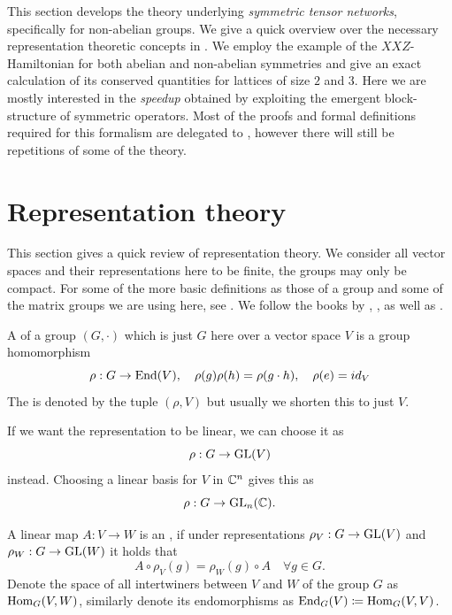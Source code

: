 This section develops the theory underlying \emph{symmetric tensor networks},
specifically for non-abelian groups. We give a quick overview over the necessary
representation theoretic concepts in . We employ the example
of the $XXZ$-Hamiltonian for both abelian and non-abelian symmetries and give an
exact calculation of its conserved quantities for lattices of size $2$ and $3$.
Here we are mostly interested in the \emph{speedup} obtained by exploiting the
emergent block-structure of symmetric operators. Most of the proofs and formal
definitions required for this formalism are delegated to ,
however there will still be repetitions of some of the theory.

\section{Representation theory}\label{sym:sub:rep}

This section gives a quick review of representation theory. We consider all
vector spaces and their representations here to be finite, the groups may only
be compact. For some of the more basic definitions as those of a group and some
of the matrix groups we are using here, see . We follow the
books by \textcite{ibortIntroductionGroupsGroupoids2019},
\textcite{serreLinearRepresentationsFinite1977},
\textcite{woitQuantumTheoryGroups2017}  as well as
\textcite{etingofIntroductionRepresentationTheory2011}.

\begin{definition}
  A  of a group $(G,\cdot)$ which is just $G$ here
  over a vector space $V$ is a group homomorphism
  \[
    \rho : G \to \operatorname{End} (V), \quad \rho(g)\rho(h) = \rho(g \cdot h), \quad \rho(e) = id_V
  \]
  The  is denoted by the tuple $(\rho, V)$
  but usually we shorten this to just $V$.

  If we want the representation to be linear, we can choose it as
  \[
    \rho : G \to \mathrm{GL}(V)
  \]
  instead. Choosing a linear basis for $V$ in $\mathbb{C}^n$ gives this as 
  \[
    \rho : G \to \mathrm{GL}_n(\mathbb{C}).
  \]
\end{definition}


\begin{definition}\label{sym:def:intertwiner}
  A linear map $A : V \to W$ is an \emph{}, if under
  representations $\rho_V : G \to \mathrm{GL}(V)$ and $\rho_W : G \to \mathrm{GL}(W)$ it holds
  that
  \[
    A \circ \rho_V(g) = \rho_W (g) \circ A \quad \forall g \in G.
  \]
  Denote the space of all intertwiners between $V$ and $W$ of the group $G$ as
  $\operatorname{Hom}_G(V,W)$, similarly denote its endomorphisms as $\operatorname{End}_G(V) \coloneqq
  \operatorname{Hom}_G(V,V)$.
\end{definition}

